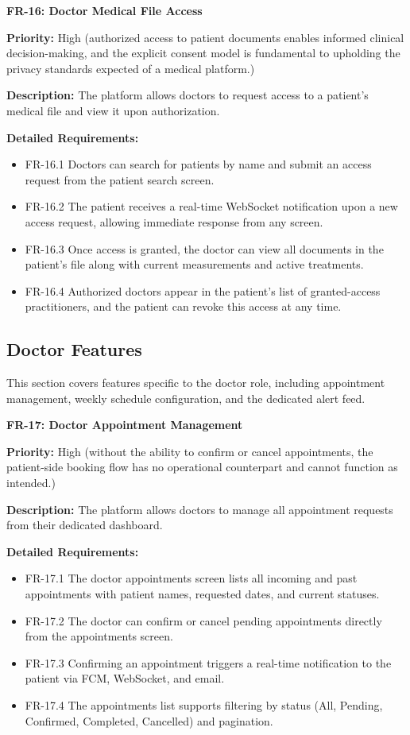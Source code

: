 \medskip

\textbf{FR-16: Doctor Medical File Access}

\textbf{Priority:} High (authorized access to patient documents enables informed clinical decision-making, and the explicit consent model is fundamental to upholding the privacy standards expected of a medical platform.)

\textbf{Description:} The platform allows doctors to request access to a patient's medical
file and view it upon authorization.

\textbf{Detailed Requirements:}
\begin{itemize}
    \item FR-16.1 \; Doctors can search for patients by name and submit an
    access request from the patient search screen.
    \item FR-16.2 \; The patient receives a real-time WebSocket notification upon a
    new access request, allowing immediate response from any screen.
    \item FR-16.3 \; Once access is granted, the doctor can view all documents
    in the patient's file along with current measurements and active treatments.
    \item FR-16.4 \; Authorized doctors appear in the patient's list of granted-access
    practitioners, and the patient can revoke this access at any time.
\end{itemize}

\subsection{Doctor Features}

This section covers features specific to the doctor role, including appointment
management, weekly schedule configuration, and the dedicated alert feed.

\textbf{FR-17: Doctor Appointment Management}

\textbf{Priority:} High (without the ability to confirm or cancel appointments, the patient-side booking flow has no operational counterpart and cannot function as intended.)

\textbf{Description:} The platform allows doctors to manage all appointment requests
from their dedicated dashboard.

\textbf{Detailed Requirements:}
\begin{itemize}
    \item FR-17.1 \; The doctor appointments screen lists all incoming and past
    appointments with patient names, requested dates, and current statuses.
    \item FR-17.2 \; The doctor can confirm or cancel pending appointments
    directly from the appointments screen.
    \item FR-17.3 \; Confirming an appointment triggers a real-time notification to the
    patient via FCM, WebSocket, and email.
    \item FR-17.4 \; The appointments list supports filtering by status (All, Pending,
    Confirmed, Completed, Cancelled) and pagination.
\end{itemize}

